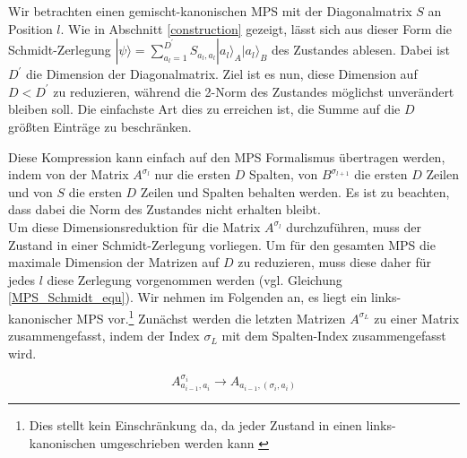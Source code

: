 \documentclass[10pt,a4paper]{report}
\begin{document}
Wir betrachten einen gemischt-kanonischen MPS mit der Diagonalmatrix $S$ an Position $l$. Wie in Abschnitt \ref{construction} gezeigt, lässt sich aus dieser Form die Schmidt-Zerlegung $|\psi\rangle=\sum_{a_l=1}^{D^{\prime}} S_{a_l,a_l}|a_l\rangle_A|a_l\rangle_B$ des Zustandes ablesen. Dabei ist $D^\prime$ die Dimension der Diagonalmatrix. Ziel ist es nun, diese Dimension auf $D<D^\prime$ zu reduzieren, während die 2-Norm des Zustandes möglichst unverändert bleiben soll.
Die einfachste Art dies zu erreichen ist, die Summe auf die $D$ größten Einträge zu beschränken.


Diese Kompression kann einfach auf den MPS Formalismus übertragen werden, indem von der Matrix $A^{\sigma_l}$ nur die ersten $D$ Spalten, von $B^{\sigma_{l+1}}$ die ersten $D$ Zeilen und von $S$ die ersten $D$ Zeilen und Spalten behalten werden. Es ist zu beachten, dass dabei die Norm des Zustandes nicht erhalten bleibt.\\

Um diese Dimensionsreduktion für die Matrix $A^{\sigma_l}$ durchzuführen, muss der Zustand in einer Schmidt-Zerlegung vorliegen. Um für den gesamten MPS die maximale Dimension der Matrizen auf $D$ zu reduzieren, muss diese daher für jedes $l$ diese Zerlegung vorgenommen werden (vgl. Gleichung \ref{MPS_Schmidt_equ}). Wir nehmen im Folgenden an, es liegt ein links-kanonischer MPS vor.\footnote{Dies stellt kein Einschränkung da, da jeder Zustand in einen links-kanonischen umgeschrieben werden kann \cite[Seite~129]{MPS-main}} Zunächst werden die letzten Matrizen $A^{\sigma_L}$ zu einer Matrix zusammengefasst, indem der Index $\sigma_L$ mit dem Spalten-Index zusammengefasst wird.

\begin{equation}
A_{a_{i-1},a_i}^{\sigma_i}\rightarrow A_{a_{i-1},(\sigma_i,a_i)}
\end{equation}
\end{document}
